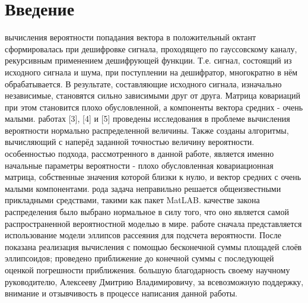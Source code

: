 \newpage
\section{Введение}
 вычисления вероятности попадания вектора в положительный октант сформировалась при дешифровке сигнала, проходящего по гауссовскому каналу, рекурсивным применением дешифрующей функции. Т.е. сигнал, состоящий из исходного сигнала и шума, при поступлении на дешифратор, многократно в нём обрабатывается. В результате, составляющие исходного сигнала, изначально независимые, становятся сильно зависимыми друг от друга. Матрица ковариаций при этом становится плохо обусловленной, а компоненты вектора средних - очень малыми.
 работах [3], [4] и [5] проведены исследования в проблеме вычисления вероятности нормально распределенной величины. Также созданы алгоритмы, вычисляющий с наперёд заданной точностью величину вероятности.
 особенностью подхода, рассмотренного в данной работе, является именно начальные параметры вероятности - плохо обусловленная ковариационная матрица, собственные значения которой близки к нулю, и вектор средних с очень малыми компонентами. 
 рода задача неправильно решается общеизвестными прикладными средствами, такими как пакет MatLAB.
 качестве закона распределения было выбрано нормальное в силу того, что оно является самой распространенной вероятностной моделью в мире.
 работе сначала представляется использование модели эллипсов рассеяния для подсчета вероятности. После показана реализация вычисления с помощью бесконечной суммы площадей слоёв эллипсоидов; проведено приближение до конечной суммы с последующей оценкой погрешности приближения.
 большую благодарность своему научному руководителю, Алексееву Дмитрию Владимировичу, за всевозможную поддержку, внимание и отзывчивость в процессе написания данной работы.